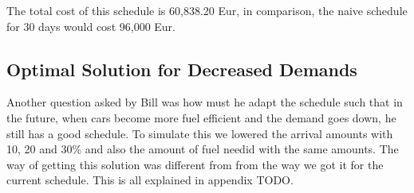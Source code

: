 The total cost of this schedule is 60,838.20 Eur, in comparison, the naive schedule for 30 days would cost 96,000 Eur.


\subsection{Optimal Solution for Decreased Demands}
Another question asked by Bill was how must he adapt the schedule such that in the future, when cars become more fuel efficient and the demand goes down, he still has a good schedule. 
To simulate this we lowered the arrival amounts with 10, 20 and 30\% and  also the amount of fuel needid with the same amounts. 
The way of getting this solution was different from from the way we got it for the current schedule.
This is all explained in appendix TODO.